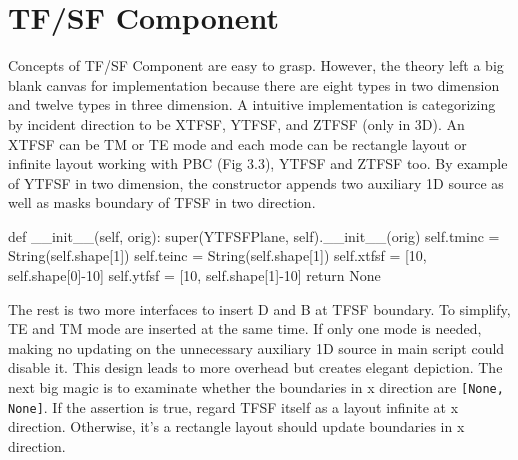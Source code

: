 \section{TF/SF Component}
Concepts of TF/SF Component are easy to grasp. However, the theory left a big blank canvas for implementation because
there are eight types in two dimension and twelve types in three dimension. A intuitive implementation is categorizing
by incident direction to be XTFSF, YTFSF, and ZTFSF (only in 3D). An XTFSF can be TM or TE mode and each mode can be
rectangle layout or infinite layout working with PBC (Fig 3.3), YTFSF and ZTFSF too. By example of YTFSF in two
dimension, the constructor appends two auxiliary 1D source as well as masks boundary of TFSF in two direction. 
\begin{code}
    def __init__(self, orig):
        super(YTFSFPlane, self).__init__(orig)
        self.tminc = String(self.shape[1])
        self.teinc = String(self.shape[1])
        self.xtfsf = [10, self.shape[0]-10]
        self.ytfsf = [10, self.shape[1]-10]
        return None
\end{code}
The rest is two more interfaces to insert D and B at TFSF boundary. To simplify, TE and TM mode are inserted at the same
time. If only one mode is needed, making no updating on the unnecessary auxiliary 1D source in main script could disable
it. This design leads to more overhead but creates elegant depiction. The next big magic is to examinate whether the
boundaries in x direction are \texttt{[None, None]}. If the assertion is true, regard TFSF itself as a layout infinite
at x direction. Otherwise, it's a rectangle layout should update boundaries in x direction.
